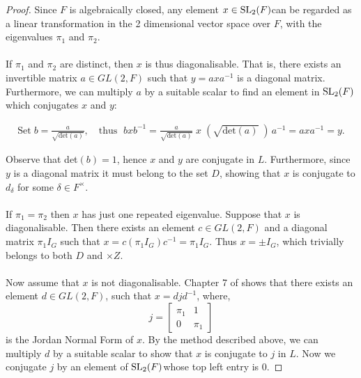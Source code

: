 \begin{proof} Since $F$ is algebraically closed, any element $x \in \operatorname{SL}_2(F)$can be regarded as a linear transformation in the 2 dimensional vector space over $F$, with the eigenvalues $\pi_1$ and $\pi_2$. \\
\\
\space If $\pi_1$ and $\pi_2$ are distinct, then $x$ is thus diagonalisable. That is, there exists an invertible matrix $a \in GL(2, F)$ such that $y = axa^{-1}$ is a diagonal matrix. Furthermore, we can multiply $a$ by a suitable scalar to find an element in $\operatorname{SL}_2(F)$which conjugates $x$ and $y$:

\begin{align*}
    \text{Set} \; b = \frac{a}{\sqrt {\text{det}(a)}}, \quad \text{thus } \; bxb^{-1} =\frac{a}{\sqrt {\text{det}(a)}} \; x \; (\sqrt{\text{det}(a)} \; )\,a^{-1} = axa^{-1} = y.
\end{align*}

Observe that det$(b)=1$, hence $x$ and $y$ are conjugate in $L$. Furthermore, since $y$ is a diagonal matrix it must belong to the set $D$, showing that $x$ is conjugate to $d_\delta$ for some $\delta \in F^\times$. \\
\\
\space If $\pi_1 = \pi_2$ then $x$ has just one repeated eigenvalue. Suppose that $x$ is diagonalisable. Then there exists an element $c \in GL(2, F)$ and a diagonal matrix $\pi_1 I_G$ such that $x = c(\pi_1 I_G)c^{-1} = \pi_1 I_G$. Thus $x = \pm I_G$, which trivially belongs to both $D$ and $\times Z$. \\
\\
Now assume that $x$ is not diagonalisable. Chapter 7 of \cite{matrix} shows that there exists an element $d \in GL(2, F)$, such that $x= djd^{-1}$, where, $$j = \begin{bmatrix} \pi_1 & 1 \\ 0 & \pi_1 \end{bmatrix}$$ is the Jordan Normal Form of $x$. By the method described above, we can multiply $d$ by a suitable scalar to show that $x$ is conjugate to $j$ in $L$. Now we conjugate $j$ by an element of $\operatorname{SL}_2(F)$whose top left entry is 0.


\end{proof}
